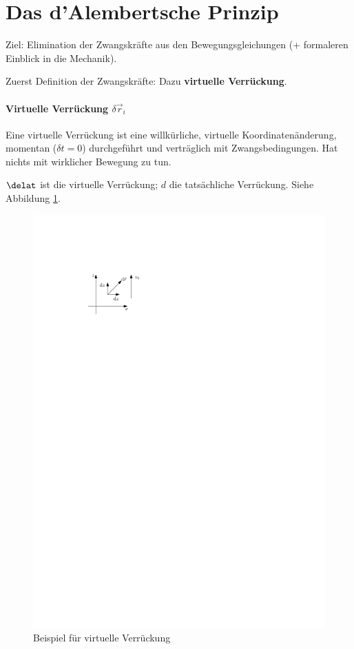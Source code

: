 \section{Das d'Alembertsche Prinzip}
Ziel: Elimination der Zwangskräfte aus den Bewegungsgleichungen (+ formaleren Einblick in die Mechanik). 

Zuerst Definition der Zwangskräfte: Dazu \textbf{virtuelle Verrückung}.

\paragraph{Virtuelle Verrückung $\delta \vec r_i$}
Eine virtuelle Verrückung ist eine willkürliche, virtuelle Koordinatenänderung, momentan ($\delta t = 0$) durchgeführt und verträglich mit Zwangsbedingungen. Hat nichts mit wirklicher Bewegung zu tun.

$\delat$ ist die virtuelle Verrückung; $d$ die tatsächliche Verrückung. Siehe Abbildung \ref{fig:ch1_bspverrueckung}.

\begin{figure}
	\centering
	\includegraphics{figures/ch1/bspverrueckung}
	\caption{Beispiel für virtuelle Verrückung}
	\label{fig:ch1_bspverrueckung}
\end{figure}


